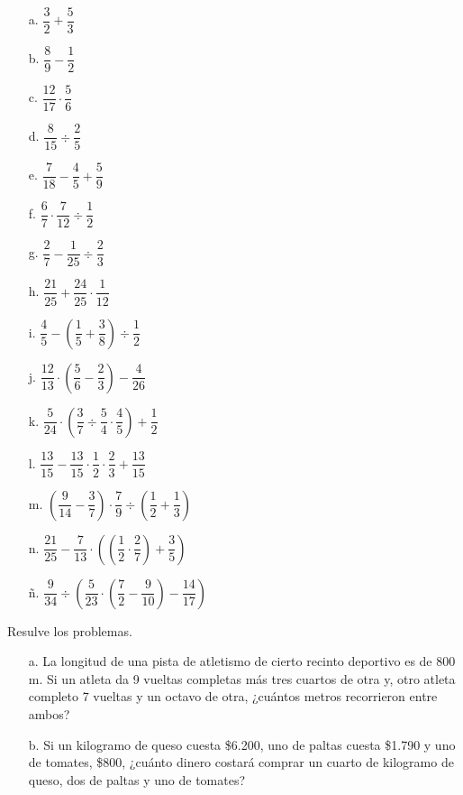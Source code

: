 \documentclass[spanish,letterpaper, 11pt, addpoints, answers]{exam}
\begin{document}
\begin{questions}
\begin{multicols}{2}
  \begin{itemize}
    \item[a.] $\dfrac{3}{2}+\dfrac{5}{3}$
  \item[b.] $\dfrac{8}{9}-\dfrac{1}{2}$
  \item[c.] $\dfrac{12}{17}\cdot \dfrac{5}{6}$
  \item[d.] $\dfrac{8}{15}\div \dfrac{2}{5}$
  \item[e.] $\dfrac{7}{18}-\dfrac{4}{5}+\dfrac{5}{9}$
  \item[f.] $\dfrac{6}{7}\cdot\dfrac{7}{12}\div \dfrac{1}{2}$
  \item[g.] $\dfrac{2}{7}-\dfrac{1}{25}\div \dfrac{2}{3}$
  \item[h.] $\dfrac{21}{25}+\dfrac{24}{25}\cdot \dfrac{1}{12}$
  \item[i.] $\dfrac{4}{5}-\left(\dfrac{1}{5}+\dfrac{3}{8}\right)\div \dfrac{1}{2}$
  \item[j.] $\dfrac{12}{13}\cdot \left(\dfrac{5}{6}-\dfrac{2}{3}\right)-\dfrac{4}{26}$
  \item[k.] $\dfrac{5}{24}\cdot \left(\dfrac{3}{7}\div \dfrac{5}{4}\cdot \dfrac{4}{5}\right)+\dfrac{1}{2}$
  \item[l.] $\dfrac{13}{15}-\dfrac{13}{15}\cdot \dfrac{1}{2}\cdot \dfrac{2}{3}+\dfrac{13}{15}$
  \item[m.] $\left(\dfrac{9}{14}-\dfrac{3}{7}\right)\cdot \dfrac{7}{9}\div \left(\dfrac{1}{2}+\dfrac{1}{3}\right)$
  \item[n.] $\dfrac{21}{25}-\dfrac{7}{13}\cdot \left(\left(\dfrac{1}{2}\cdot \dfrac{2}{7}\right)+\dfrac{3}{5}\right)$
  \item[ñ.] $\dfrac{9}{34}\div \left(\dfrac{5}{23}\cdot \left(\dfrac{7}{2}-\dfrac{9}{10}\right)-\dfrac{14}{17}\right)$  
  \end{itemize}
\end{multicols}
  
\question Resulve los problemas.

\begin{itemize}
  \item[a.] La longitud de una pista de atletismo de cierto recinto deportivo es de 800 m. Si un atleta da 9 vueltas completas más tres cuartos de otra y, otro atleta completo 7 vueltas y un octavo de otra, ¿cuántos metros recorrieron entre ambos?
  \item[b.] Si un kilogramo de queso cuesta \$6.200, uno de paltas cuesta \$1.790 y uno de tomates, \$800, ¿cuánto dinero costará comprar un cuarto de kilogramo de queso, dos de paltas y uno de tomates?
\end{itemize}


\end{questions}
\end{document}
